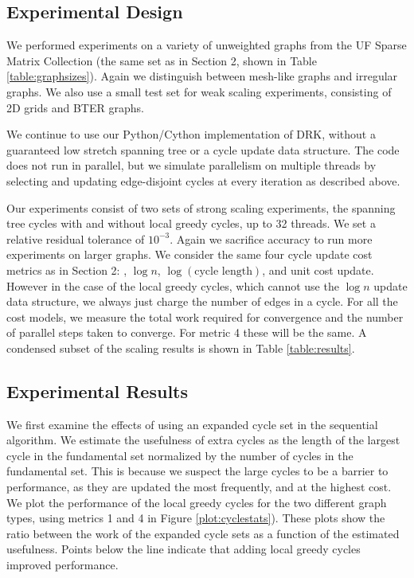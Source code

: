 \documentclass{sig-alternate}
\begin{document}
\subsection{Experimental Design}
We performed experiments on a variety of unweighted graphs
from the UF Sparse Matrix Collection
(the same set as in Section 2,
shown in Table \ref{table:graphsizes}).
Again we distinguish between mesh-like graphs and irregular graphs.
We also use a small test set for weak scaling experiments, consisting
of 2D grids and BTER graphs.

We continue to use our Python/Cython implementation of DRK,
without a guaranteed low stretch spanning
tree or a cycle update data structure.
The code does not run in parallel,
but we simulate parallelism on multiple threads by selecting and updating
edge-disjoint cycles at every iteration as described above.

Our experiments consist of two sets of strong scaling experiments,
the spanning tree cycles with and without local greedy cycles, up to
32 threads. We set a relative residual tolerance of $10^{-3}$.
Again we sacrifice accuracy to run more experiments on larger graphs.
We consider the same four cycle update cost metrics
as in Section 2: , $\log{n}$,
$\log(\text{cycle length})$, and unit cost update.
However in the case of the local greedy cycles, which cannot use the
$\log{n}$ update data structure, we always just
charge the number of edges in a cycle.
For all the cost models, we measure the total work required for convergence
and the number of parallel steps taken to converge. For metric 4 these
will be the same. A condensed subset of the scaling results
is shown in Table \ref{table:results}.

\subsection{Experimental Results}
We first examine the effects of using an expanded
cycle set in the sequential algorithm.
We estimate the usefulness of extra cycles
as the length of the largest cycle in the fundamental set normalized
by the number of cycles in the fundamental set. This is because
we suspect the large cycles to be a barrier to performance, as they
are updated the most frequently, and at the highest cost.
We plot the performance of the local greedy cycles
for the two different graph types, using metrics 1 and 4 in Figure
\ref{plot:cyclestats}).
These plots show the ratio between the work
of the expanded cycle sets as a function of the estimated
usefulness. Points below the line indicate that adding local greedy cycles
improved performance.
\end{document}
